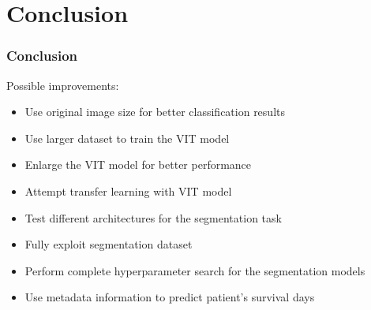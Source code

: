 \documentclass[../presentation.tex]{subfiles} %
\begin{document}
\section{Conclusion}

\begin{frame}
    
    \frametitle{Conclusion}

    Possible improvements:
    \vspace{0.2cm}
    \begin{itemize}
        \item Use original image size for better classification results
        \item Use larger dataset to train the VIT model
        \item Enlarge the VIT model for better performance
        \item Attempt transfer learning with VIT model
        \item Test different architectures for the segmentation task
        \item Fully exploit segmentation dataset
        \item Perform complete hyperparameter search for the segmentation models
        \item Use metadata information to predict patient's survival days
    \end{itemize}

\end{frame}
\end{document}
